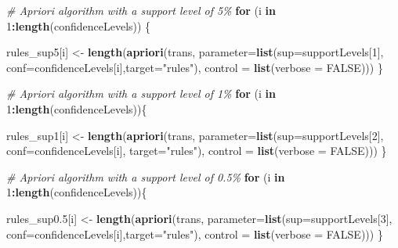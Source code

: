\documentclass[
]{article}
\newenvironment{Shaded}{\begin{snugshade}}{\end{snugshade}}
\newcommand{\AttributeTok}[1]{\textcolor[rgb]{0.13,0.29,0.53}{#1}}
\newcommand{\CommentTok}[1]{\textcolor[rgb]{0.56,0.35,0.01}{\textit{#1}}}
\newcommand{\ConstantTok}[1]{\textcolor[rgb]{0.56,0.35,0.01}{#1}}
\newcommand{\ControlFlowTok}[1]{\textcolor[rgb]{0.13,0.29,0.53}{\textbf{#1}}}
\newcommand{\DecValTok}[1]{\textcolor[rgb]{0.00,0.00,0.81}{#1}}
\newcommand{\FloatTok}[1]{\textcolor[rgb]{0.00,0.00,0.81}{#1}}
\newcommand{\FunctionTok}[1]{\textcolor[rgb]{0.13,0.29,0.53}{\textbf{#1}}}
\newcommand{\NormalTok}[1]{#1}
\newcommand{\OtherTok}[1]{\textcolor[rgb]{0.56,0.35,0.01}{#1}}
\newcommand{\SpecialCharTok}[1]{\textcolor[rgb]{0.81,0.36,0.00}{\textbf{#1}}}
\newcommand{\StringTok}[1]{\textcolor[rgb]{0.31,0.60,0.02}{#1}}
\begin{document}
\begin{Shaded}
\begin{Highlighting}[]
\CommentTok{\# Apriori algorithm with a support level of 5\%}
\ControlFlowTok{for}\NormalTok{ (i }\ControlFlowTok{in} \DecValTok{1}\SpecialCharTok{:}\FunctionTok{length}\NormalTok{(confidenceLevels)) \{}
  
\NormalTok{  rules\_sup5[i] }\OtherTok{\textless{}{-}} \FunctionTok{length}\NormalTok{(}\FunctionTok{apriori}\NormalTok{(trans, }\AttributeTok{parameter=}\FunctionTok{list}\NormalTok{(}\AttributeTok{sup=}\NormalTok{supportLevels[}\DecValTok{1}\NormalTok{], }
                                                         \AttributeTok{conf=}\NormalTok{confidenceLevels[i],}\AttributeTok{target=}\StringTok{"rules"}\NormalTok{), }
                                \AttributeTok{control =} \FunctionTok{list}\NormalTok{(}\AttributeTok{verbose =} \ConstantTok{FALSE}\NormalTok{)))}
\NormalTok{\}}

\CommentTok{\# Apriori algorithm with a support level of 1\%}
\ControlFlowTok{for}\NormalTok{ (i }\ControlFlowTok{in} \DecValTok{1}\SpecialCharTok{:}\FunctionTok{length}\NormalTok{(confidenceLevels))\{}
  
\NormalTok{  rules\_sup1[i] }\OtherTok{\textless{}{-}} \FunctionTok{length}\NormalTok{(}\FunctionTok{apriori}\NormalTok{(trans, }\AttributeTok{parameter=}\FunctionTok{list}\NormalTok{(}\AttributeTok{sup=}\NormalTok{supportLevels[}\DecValTok{2}\NormalTok{], }
                                                        \AttributeTok{conf=}\NormalTok{confidenceLevels[i], }\AttributeTok{target=}\StringTok{"rules"}\NormalTok{), }
                                \AttributeTok{control =} \FunctionTok{list}\NormalTok{(}\AttributeTok{verbose =} \ConstantTok{FALSE}\NormalTok{)))}
\NormalTok{\}}

\CommentTok{\# Apriori algorithm with a support level of 0.5\%}
\ControlFlowTok{for}\NormalTok{ (i }\ControlFlowTok{in} \DecValTok{1}\SpecialCharTok{:}\FunctionTok{length}\NormalTok{(confidenceLevels))\{}
  
\NormalTok{  rules\_sup0}\FloatTok{.5}\NormalTok{[i] }\OtherTok{\textless{}{-}} \FunctionTok{length}\NormalTok{(}\FunctionTok{apriori}\NormalTok{(trans, }\AttributeTok{parameter=}\FunctionTok{list}\NormalTok{(}\AttributeTok{sup=}\NormalTok{supportLevels[}\DecValTok{3}\NormalTok{], }
                                                        \AttributeTok{conf=}\NormalTok{confidenceLevels[i],}\AttributeTok{target=}\StringTok{"rules"}\NormalTok{), }
                                \AttributeTok{control =} \FunctionTok{list}\NormalTok{(}\AttributeTok{verbose =} \ConstantTok{FALSE}\NormalTok{)))}
\NormalTok{\}}


\end{Highlighting}
\end{Shaded}
\end{document}
